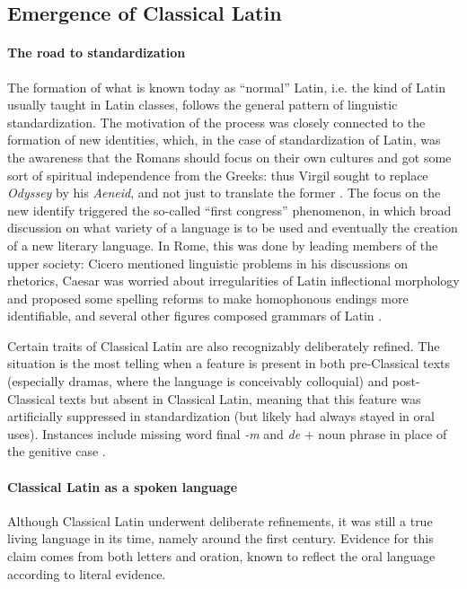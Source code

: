 \documentclass[a4paper, oneside, 12pt]{report}
\newcommand*{\citesec}[1]{\S~{#1}}
\newcommand*{\citepage}[1]{p.~{#1}}
\newcommand*{\citepages}[1]{pp.~{#1}}
\newcommand{\form}[1]{\emph{#1}}
\newcommand{\literature}[1]{\textit{#1}}
\begin{document}
\subsection{Emergence of Classical Latin}

\paragraph*{The road to standardization}\label{sec:introduction.history.classical.standard}
The formation of what is known today as ``normal'' Latin,
i.e. the kind of Latin usually taught in Latin classes,
follows the general pattern of linguistic standardization.
The motivation of the process was closely connected to the formation of new identities,
which, in the case of standardization of Latin,
was the awareness that the Romans should focus on their own cultures
and got some sort of spiritual independence from the Greeks:
thus Virgil sought to replace \literature{Odyssey} by his \literature{Aeneid},
and not just to translate the former
\citep[\citepage{66}]{leonhardt2013latin}.
The focus on the new identify triggered the so-called ``first congress'' phenomenon,
in which broad discussion on what variety of a language is to be used
and eventually the creation of a new literary language.
In Rome, this was done by leading members of the upper society:
Cicero mentioned linguistic problems in his discussions on rhetorics,
Caesar was worried about irregularities of Latin inflectional morphology
and proposed some spelling reforms to make homophonous endings more identifiable,
and several other figures composed grammars of Latin
\citep[\citepages{60-61}]{leonhardt2013latin}.

Certain traits of Classical Latin are also recognizably deliberately refined.
The situation is the most telling when a feature is present in 
both pre-Classical texts (especially dramas, where the language is conceivably colloquial) 
and post-Classical texts but absent in Classical Latin,
meaning that this feature was artificially suppressed in standardization
(but likely had always stayed in oral uses).
Instances include missing word final \form{-m}
and \form{de} + noun phrase in place of the genitive case
\citep[\citesec{2.4.4}, \citesec{8.3.1}]{alkire2010romance}.

\paragraph*{Classical Latin as a spoken language}
Although Classical Latin underwent deliberate refinements,
it was still a true living language in its time,
namely around the first century.
Evidence for this claim comes from both letters and oration,
known to reflect the oral language according to literal evidence.
\end{document}

